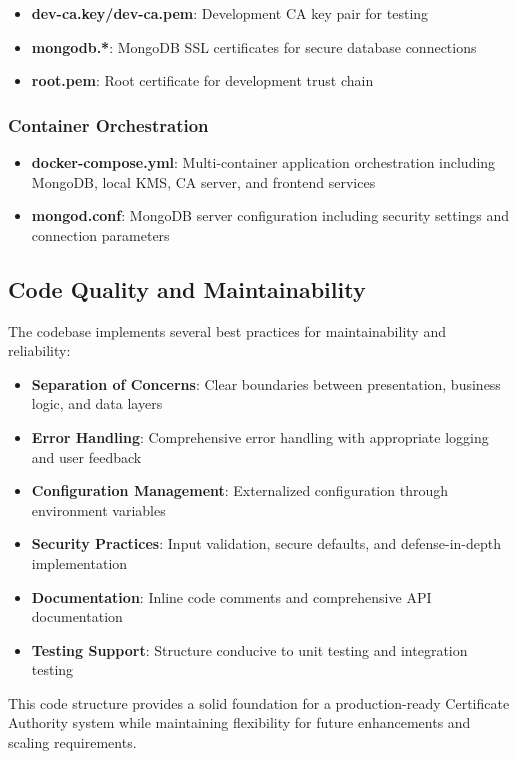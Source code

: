 \begin{itemize}
    \item \textbf{dev-ca.key/dev-ca.pem}: Development CA key pair for testing
    \item \textbf{mongodb.*}: MongoDB SSL certificates for secure database connections
    \item \textbf{root.pem}: Root certificate for development trust chain
\end{itemize}

\subsubsection{Container Orchestration}

\begin{itemize}
    \item \textbf{docker-compose.yml}: Multi-container application orchestration including MongoDB, local KMS, CA server, and frontend services
    \item \textbf{mongod.conf}: MongoDB server configuration including security settings and connection parameters
\end{itemize}

\subsection{Code Quality and Maintainability}

The codebase implements several best practices for maintainability and reliability:

\begin{itemize}
    \item \textbf{Separation of Concerns}: Clear boundaries between presentation, business logic, and data layers
    \item \textbf{Error Handling}: Comprehensive error handling with appropriate logging and user feedback
    \item \textbf{Configuration Management}: Externalized configuration through environment variables
    \item \textbf{Security Practices}: Input validation, secure defaults, and defense-in-depth implementation
    \item \textbf{Documentation}: Inline code comments and comprehensive API documentation
    \item \textbf{Testing Support}: Structure conducive to unit testing and integration testing
\end{itemize}

This code structure provides a solid foundation for a production-ready Certificate Authority system while maintaining flexibility for future enhancements and scaling requirements.